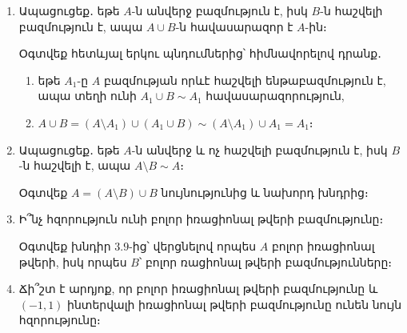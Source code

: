 \begin{enumerate}[label=\thesection.\arabic*.]
\item Ապացուցեք․ եթե $A$-ն անվերջ բազմություն է, իսկ $B$-ն հաշվելի բազմություն է, ապա $A \cup B$-ն հավասարազոր է $A$-ին։

\begin{hint}
    Օգտվեք հետևյալ երկու պնդումներից՝ հիմնավորելով դրանք․
\begin{enumerate}
    \item [ա)] եթե $A_1$-ը $A$ բազմության որևէ հաշվելի ենթաբազմություն է, ապա տեղի ունի $A_1 \cup B \sim A_1$ հավասարազորություն,
    \item [բ)] $A \cup B=\left(A \setminus A_1\right) \cup\left(A_1 \cup B\right) \sim \left(A \setminus A_1\right) \cup A_1 = A_1$։
\end{enumerate}
\end{hint}


\item Ապացուցեք․ եթե $A$-ն անվերջ և ոչ հաշվելի բազմություն է, իսկ $B$-ն հաշվելի է, ապա $A \setminus B \sim A$։

\begin{hint}
    Օգտվեք $A=(A \setminus B) \cup B$ նույնությունից և նախորդ խնդրից։
\end{hint}

\item Ի՞նչ հզորություն ունի բոլոր իռացիոնալ թվերի բազմությունը։ 

\begin{hint}
    Օգտվեք խնդիր $3.9$-ից՝ վերցնելով որպես $A$ բոլոր իռացիոնալ թվե\-րի, իսկ որպես $B$՝ բոլոր ռացիոնալ թվերի բազմությունները։
\end{hint}


\item Ճի՞շտ է արդյոք, որ բոլոր իռացիոնալ թվերի բազմությունը և $(-1, 1)$ ին\-տեր\-վալի իռացիոնալ թվերի բազմությունը ունեն նույն հզորությունը։
\end{enumerate}
